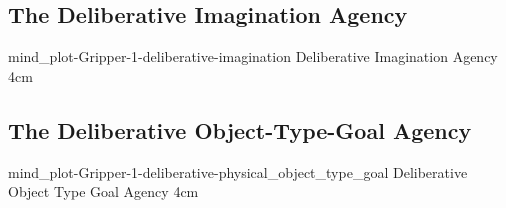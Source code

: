 {\clearpage
  \subsection{The Deliberative Imagination Agency}
  \experimentcausegroupplots{\dataappendixmaxtime}
                            {\dataappendixexperimentonemaxtime}
                            {\dataappendixexperimenttwomaxtime}
                            {\dataappendixexperimentthreemaxtime}
                            {\dataappendixexperimentonename}
                            {\dataappendixexperimenttwoname}
                            {\dataappendixexperimentthreename}
                            {\dataappendixexperimentoneprettyname}
                            {\dataappendixexperimenttwoprettyname}
                            \experimentcausegroupplotscontinued{\dataappendixexperimentthreeprettyname}
                                                               {mind_plot-Gripper-1-deliberative-imagination}
                                                               {Deliberative Imagination Agency}
                                                               {\experimentdatacommontablereference}
                                                               {4cm}
}
{\clearpage
  \subsection{The Deliberative Object-Type-Goal Agency}
  \experimentcausegroupplots{\dataappendixmaxtime}
                            {\dataappendixexperimentonemaxtime}
                            {\dataappendixexperimenttwomaxtime}
                            {\dataappendixexperimentthreemaxtime}
                            {\dataappendixexperimentonename}
                            {\dataappendixexperimenttwoname}
                            {\dataappendixexperimentthreename}
                            {\dataappendixexperimentoneprettyname}
                            {\dataappendixexperimenttwoprettyname}
                            \experimentcausegroupplotscontinued{\dataappendixexperimentthreeprettyname}
                                                               {mind_plot-Gripper-1-deliberative-physical_object_type_goal}
                                                               {Deliberative Object Type Goal Agency}
                                                               {\experimentdatacommontablereference}
                                                               {4cm}
}
